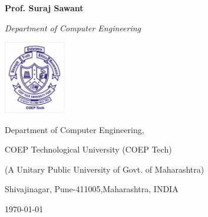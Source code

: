 \begin{titlepage}
{\begin{center}
\begin{singlespace*}
 	\vspace{0.9cm}
 	{\Large\bfseries  Prof. Suraj Sawant \par}
 	{\Large \itshape Department of Computer Engineering \par}
 	\vspace{0.5cm}
 	\includegraphics[width=0.2\textwidth]{images/coeplogo.jpg}
 	\par
 	\vspace{0.5cm}
 	{\Large Department of Computer Engineering, \par}
 	{\Large COEP Technological University (COEP Tech) \par
         (A Unitary Public University of Govt. of Maharashtra)  \par}
 	{\Large Shivajinagar, Pune-411005,Maharashtra, INDIA \par}
 	\par
 	\vspace{0.2cm}
 	{\large \monthyeardate\today\par}
	\endgroup
\end{singlespace*}


\end{center}
}
\end{titlepage}
